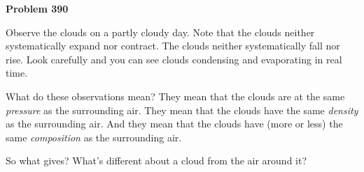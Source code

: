 \documentclass[12pt]{article}
\begin{document}
\begin{pottproblem}
\textbf{Problem 390}

Observe the clouds on a partly cloudy day.
Note that the clouds neither systematically expand nor contract.
The clouds neither systematically fall nor rise.
Look carefully and you can see clouds condensing and evaporating in real time.

What do these observations mean?
They mean that the clouds are at the same \emph{pressure} as the surrounding air.
They mean that the clouds have the same \emph{density} as the surrounding air.
And they mean that the clouds have (more or less) the same \emph{composition} as the surrounding air.

So what gives? What's different about a cloud from the air around it?

\end{pottproblem}
\end{document}
